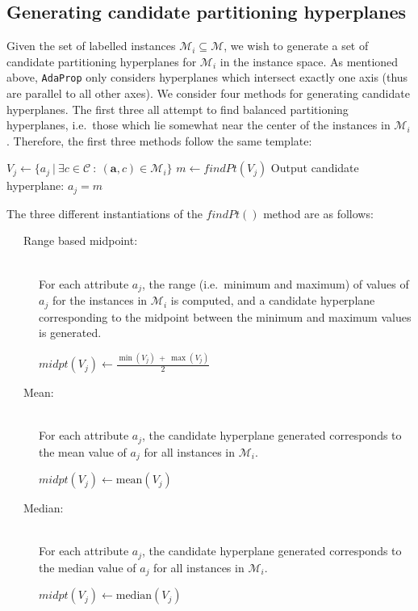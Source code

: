 \documentclass[a4paper,12pt]{report} %
\newcommand{\AdaProp}{\texttt{AdaProp}\xspace}
\newcommand{\mcl}[1]{\mathcal{#1}}
\newcommand{\vect}[1]{\boldsymbol{#1}}
\begin{document}
\subsection{Generating candidate partitioning hyperplanes}
\label{secCandGen}

Given the set of labelled instances $\mcl{M}_i \subseteq \mcl{M}$,
    we wish to generate a set of candidate partitioning hyperplanes for $\mcl{M}_i$
    in the instance space.
As mentioned above, 
    \AdaProp only considers hyperplanes 
    which intersect exactly one axis
    (thus are parallel to all other axes).
We consider four methods for generating candidate hyperplanes.
The first three all attempt to find balanced partitioning hyperplanes, 
    i.e.\ those which lie somewhat near the center of the instances
    in $\mcl{M}_i$.
Therefore, the first three methods follow the same template:
    \begin{algorithmic}
        \State $V_j \gets \{ a_j ~\big|~ \exists c \in \mcl{C} ~:~ (\vect{a},c) \in \mcl{M}_i \}$
        \State $m \gets findPt(V_j)$
        \State Output candidate hyperplane: $a_j = m $
    \EndFor
    \end{algorithmic}
        
The three different instantiations of the $findPt()$ method are as follows:
\begin{description}

\item[~~~Range based midpoint:] \ \\
    For each attribute $a_j$, 
    the range (i.e.\ minimum and maximum) of 
        values of $a_j$ 
        for the instances in $\mcl{M}_i$ is computed, 
        and a candidate hyperplane corresponding to the midpoint between the 
        minimum and maximum values is generated.
    \begin{algorithmic}
        \State $midpt(V_j) \gets \frac{\min(V_j) ~+~ \max(V_j)}{2}$
    \end{algorithmic}
    
\item[~~~Mean:]  \ \\
    For each attribute $a_j$, 
        the candidate hyperplane generated corresponds to 
        the mean value of $a_j$ 
        for all instances in $\mcl{M}_i$.
    \begin{algorithmic}
        \State $midpt(V_j) \gets \textrm{mean}(V_j)$
    \end{algorithmic}    

\item[~~~Median:]  \ \\
    For each attribute $a_j$, 
        the candidate hyperplane generated corresponds to 
        the median value of $a_j$ 
        for all instances in $\mcl{M}_i$.
    \begin{algorithmic}
        \State $midpt(V_j) \gets \textrm{median}(V_j)$
    \end{algorithmic}  
\end{description}
\end{document}
